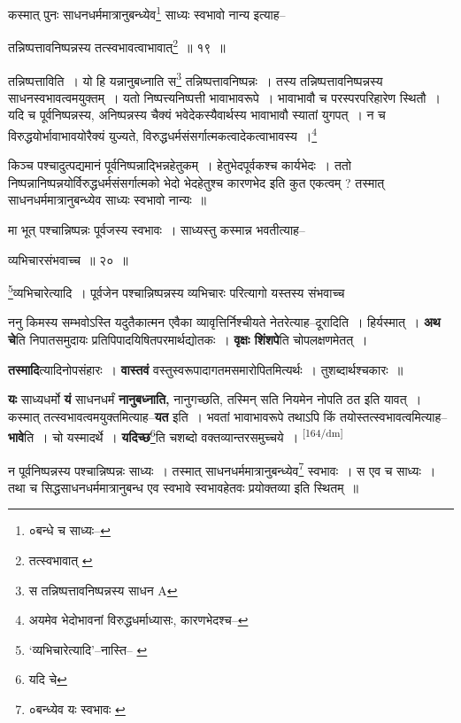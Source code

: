 \documentclass[article,12pt,a4paper]{memoir}
\begin{document}
	  \pstart कस्मात् पुनः साधनधर्ममात्रानुबन्ध्येव\footnote{०बन्धे च साध्यः--\cite{dp-msB}} साध्यः स्वभावो नान्य इत्याह--
	\pend
       

	  \pstart तन्निष्पत्तावनिष्पन्नस्य तत्स्वभावत्वाभावात्\footnote{तत्स्वभावात् \cite{dp-msC}} ॥ १९ ॥
	\pend
       

	  \pstart तन्निष्पत्ताविति । यो हि यन्नानुबध्नाति स\footnote{स तन्निष्पत्तावनिष्पन्नस्य साधन A} तन्निष्पत्तावनिष्पन्नः । तस्य तन्निष्पत्तावनिष्पन्नस्य साधनस्वभावत्वमयुक्तम् । यतो निष्पत्त्यनिष्पत्ती भावाभावरूपे । भावाभावौ च परस्परपरिहारेण स्थितौ । यदि च पूर्वनिष्पन्नस्य, अनिष्पन्नस्य चैक्यं भवेदेकस्यैवार्थस्य भावाभावौ स्यातां युगपत् । न च विरुद्धयोर्भावाभावयोरैक्यं युज्यते, विरुद्धधर्मसंसर्गात्मकत्वादेकत्वाभावस्य ।\footnote{अयमेव भेदोभावनां विरुद्धधर्माध्यासः, कारणभेदश्च--\cite{dp-msD-n}}
	\pend
       

	  \pstart किञ्च पश्चादुत्पद्यमानं पूर्वनिष्पन्नाद्भिन्नहेतुकम् । हेतुभेदपूर्वकश्च कार्यभेदः । ततो निष्पन्नानिष्पन्नयोर्विरुद्धधर्मसंसर्गात्मको भेदो भेदहेतुश्च कारणभेद इति कुत एकत्वम् ? तस्मात् साधनधर्ममात्रानुबन्ध्येव साध्यः स्वभावो नान्यः ॥
	\pend
       

	  \pstart मा भूत् पश्चान्निष्पन्नः पूर्वजस्य स्वभावः । साध्यस्तु कस्मान्न भवतीत्याह--
	\pend
       

	  \pstart व्यभिचारसंभवाच्च ॥ २० ॥
	\pend
       

	  \pstart \footnote{‘व्यभिचारेत्यादि’--नास्ति--\cite{dp-msA} \cite{dp-msB} \cite{dp-msD} \cite{dp-edP} \cite{dp-edH} \cite{dp-edE} \cite{dp-edN}}व्यभिचारेत्यादि । पूर्वजेन पश्चान्निष्पन्नस्य व्यभिचारः परित्यागो यस्तस्य संभवाच्च
	\pend
      

	  \pstart ननु किमस्य सम्भवोऽस्ति यदुतैकात्मन एवैका व्यावृत्तिर्निश्चीयते नेतरेत्याह--दूरादिति । हिर्यस्मात् । \textbf{अथ चे}ति निपातसमुदायः प्रतिपिपादयिषितपरमार्थद्योतकः । \textbf{वृक्षः शिंशपे}ति चोपलक्षणमेतत् ।
	\pend
      

	  \pstart \textbf{तस्मादि}त्यादिनोपसंहारः । \textbf{वास्तवं} वस्तुस्वरूपादागतमसमारोपितमित्यर्थः । तुशब्दार्थश्चकारः ॥
	\pend
      

	  \pstart \textbf{यः} साध्यधर्मो \textbf{यं} साधनधर्मं \textbf{नानुबध्नाति,} नानुगच्छति, तस्मिन् सति नियमेन नोपति ठत इति यावत् । कस्मात् तत्स्वभावत्वमयुक्तमित्याह--\textbf{यत} इति । भवतां भावाभावरूपे तथाऽपि किं तयोस्तत्स्वभावत्वमित्याह--\textbf{भावे}ति । चो यस्मादर्थे । \textbf{यदिच्छ}\footnote{यदि चे}ति चशब्दो वक्तव्यान्तरसमुच्चये ।
	\pend
      \leavevmode\textsuperscript{\rmlatinfont\tiny [164/dm]}

	  \pstart न पूर्वनिष्पन्नस्य पश्चान्निष्पन्नः साध्यः । तस्मात् साधनधर्ममात्रानुबन्ध्येव\footnote{०बन्ध्येव यः स्वभावः \cite{dp-msB} \cite{dp-msC} \cite{dp-msD} \cite{dp-edE}} स्वभावः । स एव च साध्यः । तथा च सिद्धसाधनधर्ममात्रानुबन्ध एव स्वभावे स्वभावहेतवः प्रयोक्तव्या इति स्थितम् ॥
	\pend
       
\end{document}
